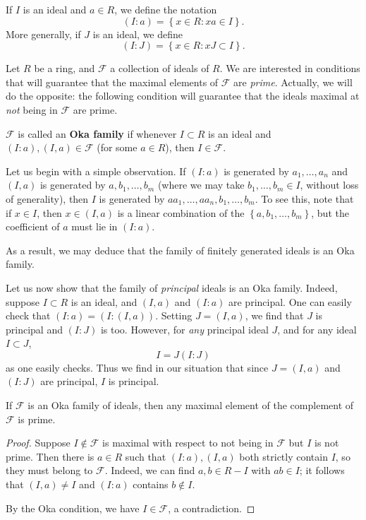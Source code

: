 If $I$ is an ideal and $a \in R$, we define the notation
\[ (I:a) = \left\{ x\in R: xa \in I\right\} . \]
More generally, if $J$ is an ideal, we define
\[ (I:J) = \left\{x \in R: xJ \subset I\right\} . \]

Let $R$ be a ring, and $\mathcal{F}$ a collection of ideals of $R$. 
We are interested in conditions that will guarantee that the maximal elements
of $\mathcal{F}$ are \emph{prime}.
Actually, we will do the opposite: the following condition will guarantee that
the ideals maximal at \emph{not} being in $\mathcal{F}$ are prime. 

\begin{definition} \label{okafamily}
$\mathcal{F}$ is called an \textbf{Oka family} if whenever $I \subset R$ is an
ideal and $(I:a), (I,a) \in \mathcal{F}$ (for some $a \in R$), then $I \in
\mathcal{F}$.
\end{definition} 

\begin{example} \label{exm:okacard}
Let us begin with a simple observation. If $(I:a)$ is generated by
$a_1, \dots, a_n$ and $(I,a)$ is generated by $a, b_1, \dots, b_m$ (where we
may take
$b_1, \dots, b_m \in I$, without loss of generality), then $I$
is generated by $aa_1, \dots, aa_n, b_1, \dots, b_m$.
To see this, note that if $x \in I$, then $x \in (I,a)$ is a linear
combination of the $\left\{a, b_1, \dots, b_m\right\}$, but the coefficient of
$a$ must
lie in $(I:a)$.

As a result, we may deduce that
the family of finitely generated ideals is an Oka family.
\end{example} 

\begin{example} 
Let us now show that the family of \emph{principal} ideals is an Oka family.
Indeed, suppose $I \subset R$ is an ideal, and $(I,a)$ and $(I:a)$ are
principal.
One can easily check that
$(I:a) = (I: (I, a))$.
Setting $J = (I,a)$, we find that $J$ is principal and $(I:J)$ is too.
However, for \emph{any} principal ideal $J$, and for any ideal $I \subset J$,
\[ I = J (I: J)  \]
as one easily checks. Thus we find in our situation that since $J=(I,a)$ and
$(I:J)$
are principal, $I$ is principal.
\end{example} 

\begin{proposition}\label{okathm} If $\mathcal{F}$ is an Oka
family of
ideals, then any maximal element of the complement of $\mathcal{F}$ is prime.
\end{proposition} 
\begin{proof} 
Suppose $I \notin \mathcal{F}$ is maximal with respect 
to not being in $\mathcal{F}$
but $I$ is  not prime.
Then there is $a \in R$ such that $(I:a), (I,a)$ both strictly contain $I$,
so they must belong to $\mathcal{F}$.
Indeed, we can find $a,b \in R - I$ with $ab \in I$; it follows that $(I,a)
\neq I$ and $(I:a)$ contains $b \notin I$.

By the Oka condition, we have $I \in
\mathcal{F}$, a contradiction.
\end{proof} 

